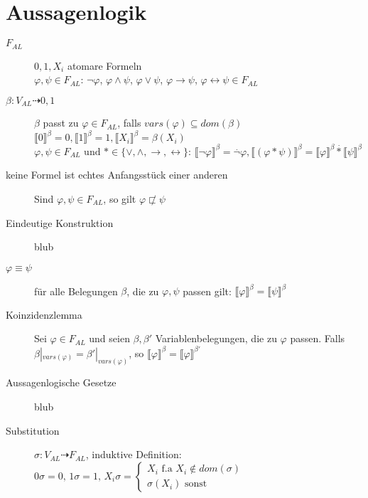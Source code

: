 \documentclass[12pt,a4paper]{scrartcl}
\author{Johannes Hedtrich}
\date{\today}
\begin{document}
  \section{Aussagenlogik}
  \begin{description}
    \item[$F_{AL}$] $0,1,X_i$ atomare Formeln\\
            $\varphi, \psi \in F_{AL}$: $\neg \varphi$, $\varphi \wedge \psi$, $\varphi \vee \psi$, $\varphi \rightarrow \psi$, $\varphi \leftrightarrow \psi \in F_{AL}$
    \item[$\beta: V_{AL} \dashrightarrow {0,1}$] $\beta$ passt zu $\varphi \in F_{AL}$, falls $vars(\varphi) \subseteq dom(\beta)$\\
            $\llbracket 0 \rrbracket^{\beta} = 0, \llbracket 1 \rrbracket^{\beta} = 1, \llbracket X_i \rrbracket^{\beta} = \beta(X_i)$\\
            $\varphi, \psi \in F_{AL} \text{ und } * \in \{\vee, \wedge, \rightarrow, \leftrightarrow\} $: $\llbracket \neg \varphi \rrbracket^{\beta} = \overset{.}{\neg} \varphi, \llbracket(\varphi * \psi)\rrbracket^{\beta} = \llbracket \varphi \rrbracket^{\beta} \overset{.}{*} \llbracket \psi \rrbracket^{\beta}$
    \item[keine Formel ist echtes Anfangsstück einer anderen] Sind $\varphi, \psi \in F_{AL}$, so gilt $\varphi \not \sqsubset \psi$
    \item[Eindeutige Konstruktion] blub
    \item[$\varphi \equiv \psi$] für alle Belegungen $\beta$, die zu $\varphi, \psi$ passen gilt: $\llbracket \varphi \rrbracket^{\beta} = \llbracket \psi \rrbracket^{\beta}$
    \item[Koinzidenzlemma] Sei $\varphi \in F_{AL}$ und seien $\beta, \beta'$ Variablenbelegungen, die zu $\varphi$ passen. Falls $\beta|_{vars(\varphi)} = \beta'|_{vars(\varphi)}$, so $\llbracket \varphi \rrbracket^{\beta} = \llbracket \varphi \rrbracket^{\beta'}$
    \item[Aussagenlogische Gesetze] blub
    \item[Substitution] $\sigma: V_{AL} \dashrightarrow F_{AL}$, induktive Definition:\\
            $0\sigma = 0 \text{, } 1\sigma = 1 \text{, } X_i \sigma = \left\{ \begin{array}{l}X_i \text{ f.a } X_i \notin dom(\sigma)\\ \sigma(X_i) \text{ sonst}\end{array} \right.$\\

\end{description}
\end{document}
